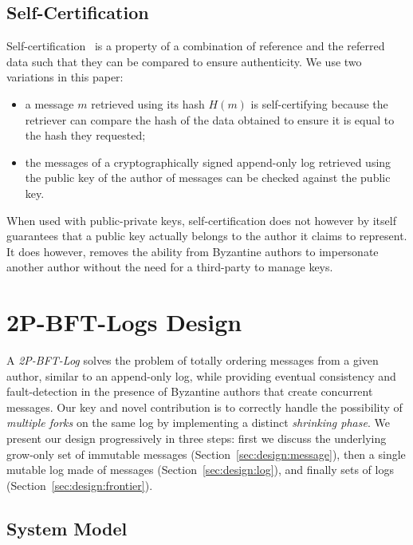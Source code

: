 \documentclass[9pt, oneside]{article}   	%
\begin{document}
\subsection{Self-Certification}
\label{sec:background:self-certification}

Self-certification~\cite{mazieres2000selfcertifyingfs} is a property of a combination of reference and the referred data such that they can be compared to ensure authenticity. We use two variations  in this paper:
\begin{itemize}
	\item a message $m$ retrieved using its hash $H(m)$ is self-certifying because the retriever can compare the hash of the data obtained to ensure it is equal to the hash they requested;
	\item the messages of a cryptographically signed append-only log retrieved using the public key of the author of messages can be checked against the public key. 
\end{itemize}

When used with public-private keys, self-certification does not however by itself guarantees that a public key actually belongs to the author it claims to represent. It does however, removes the ability from Byzantine authors to impersonate another author without the need for a third-party to manage keys.

\section{2P-BFT-Logs Design}
\label{sec:design}


A \textit{2P-BFT-Log} solves the problem of  totally ordering messages from a given author, similar to an append-only log, while providing eventual consistency and fault-detection in the presence of Byzantine authors that create concurrent messages.
Our key and novel contribution is to correctly handle the possibility of \textit{multiple forks} on the same log by implementing a distinct \textit{shrinking phase}. We present our design progressively in three steps: first we discuss the underlying grow-only set of immutable messages (Section~\ref{sec:design:message}), then a single mutable log made of messages (Section~\ref{sec:design:log}), and finally sets of logs (Section~\ref{sec:design:frontier}).

\subsection{System Model}
\end{document}
